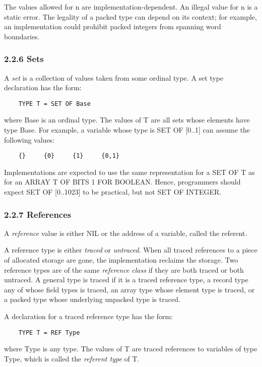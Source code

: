 \documentclass[10pt]{article}
\begin{document}
The values allowed for n are implementation-dependent.  An illegal value for n
is a static error.  The legality of a packed type can depend on its context;
for example, an implementation could prohibit packed integers from spanning
word boundaries.

\subsubsection*{2.2.6 Sets}

A \emph{set} is a collection of values taken from some ordinal type.  A set
type declaration has the form:
\begin{verbatim}
    TYPE T = SET OF Base
\end{verbatim}
where Base is an ordinal type.  The values of T are all sets whose elements
have type Base.  For example, a variable whose type is SET OF [0..1] can
assume the following values:
\begin{verbatim}
    {}     {0}     {1}     {0,1}
\end{verbatim}

Implementations are expected to use the same representation for a SET OF T as
for an ARRAY T OF BITS 1 FOR BOOLEAN.  Hence, programmers should expect SET OF
[0..1023] to be practical, but not SET OF INTEGER.

\subsubsection*{2.2.7 References}

A \emph{reference} value is either NIL or the address of a variable, called
the referent.

A reference type is either \emph{traced} or \emph{untraced}.  When all traced
references to a piece of allocated storage are gone, the implementation
reclaims the storage.  Two reference types are of the same \emph{reference
  class} if they are both traced or both untraced.  A general type is traced
if it is a traced reference type, a record type any of whose field types is
traced, an array type whose element type is traced, or a packed type whose
underlying unpacked type is traced.

A declaration for a traced reference type has the form:
\begin{verbatim}
    TYPE T = REF Type
\end{verbatim}
where Type is any type.  The values of T are traced references to variables of
type Type, which is called the \emph{referent type} of T.
\end{document}
